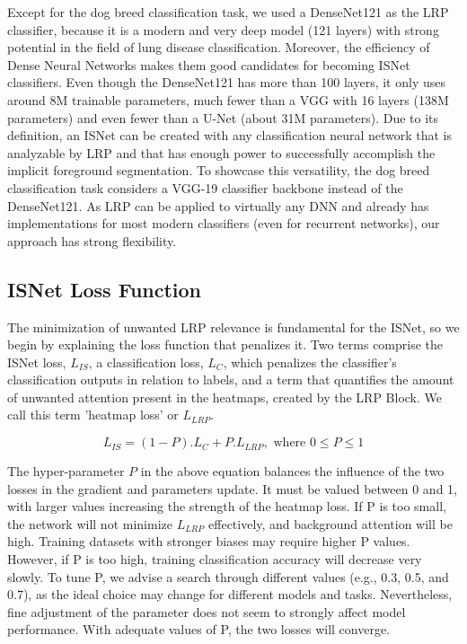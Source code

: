 \documentclass[fleqn,10pt]{wlscirep}
\begin{document}
{Except for the dog breed classification task, we used a DenseNet121 as the LRP classifier, because it is a modern and very deep model (121 layers) with strong potential in the field of lung disease classification\cite{chexnet}. Moreover, the efficiency of Dense Neural Networks makes them good candidates for becoming ISNet classifiers. Even though the DenseNet121 has more than 100 layers, it only uses around 8M trainable parameters, much fewer than a VGG with 16 layers (138M parameters) and even fewer than a U-Net (about 31M parameters). Due to its definition, an ISNet can be created with any classification neural network that is analyzable by LRP and that has enough power to successfully accomplish the implicit foreground segmentation. To showcase this versatility, the dog breed classification task considers a VGG-19 classifier backbone instead of the DenseNet121. As LRP can be applied to virtually any DNN and already has implementations for most modern classifiers\cite{innvestigate} (even for recurrent networks), our approach has strong flexibility.



\subsection{ISNet Loss Function}
\label{loss}


The minimization of unwanted LRP relevance is fundamental for the ISNet, so we begin by explaining the loss function that penalizes it. Two terms comprise the ISNet loss, $L_{IS}$, a classification loss, $L_{C}$, which penalizes the classifier's classification outputs in relation to labels, and a term that quantifies the amount of unwanted attention present in the heatmaps, created by the LRP Block. We call this term 'heatmap loss' or $L_{LRP}$.

\begin{equation}
L_{IS}=(1-P).L_{C}+P.L_{LRP}, \mbox{ where } 0 \le P \le 1
\end{equation}

The hyper-parameter $P$ in the above equation balances the influence of the two losses in the gradient and parameters update. It must be valued between 0 and 1, with larger values increasing the strength of the heatmap loss. If P is too small, the network will not minimize $L_{LRP}$ effectively, and background attention will be high. Training datasets with stronger biases may require higher P values. However, if P is too high, training classification accuracy will decrease very slowly. To tune P, we advise a search through different values (e.g., 0.3, 0.5, and 0.7), as the ideal choice may change for different models and tasks. Nevertheless, fine adjustment of the parameter does not seem to strongly affect model performance. With adequate values of P, the two losses will converge.

}
\end{document}
